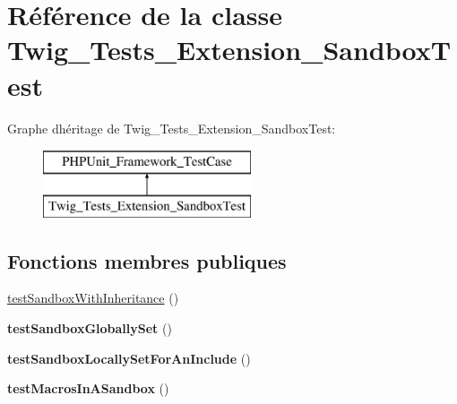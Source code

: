 \hypertarget{class_twig___tests___extension___sandbox_test}{}\section{Référence de la classe Twig\+\_\+\+Tests\+\_\+\+Extension\+\_\+\+Sandbox\+Test}
\label{class_twig___tests___extension___sandbox_test}
Graphe d\textquotesingle{}héritage de Twig\+\_\+\+Tests\+\_\+\+Extension\+\_\+\+Sandbox\+Test\+:\begin{figure}[H]
\begin{center}
\leavevmode
\includegraphics[height=2.000000cm]{class_twig___tests___extension___sandbox_test}
\end{center}
\end{figure}
\subsection*{Fonctions membres publiques}
\begin{DoxyCompactItemize}
\item 
\hyperlink{class_twig___tests___extension___sandbox_test_a5602fb01decf1742f130fb7f12834d00}{test\+Sandbox\+With\+Inheritance} ()
\item 
{\bfseries test\+Sandbox\+Globally\+Set} ()\hypertarget{class_twig___tests___extension___sandbox_test_a5cc5fb3d3c8c9c1c5fac24144f216acb}{}\label{class_twig___tests___extension___sandbox_test_a5cc5fb3d3c8c9c1c5fac24144f216acb}

\item 
{\bfseries test\+Sandbox\+Locally\+Set\+For\+An\+Include} ()\hypertarget{class_twig___tests___extension___sandbox_test_a4ce3e6ae503f6a21af040470adb07e51}{}\label{class_twig___tests___extension___sandbox_test_a4ce3e6ae503f6a21af040470adb07e51}

\item 
{\bfseries test\+Macros\+In\+A\+Sandbox} ()\hypertarget{class_twig___tests___extension___sandbox_test_a6801ac9752a974807f10aef620eb33c7}{}\label{class_twig___tests___extension___sandbox_test_a6801ac9752a974807f10aef620eb33c7}

\end{DoxyCompactItemize}
